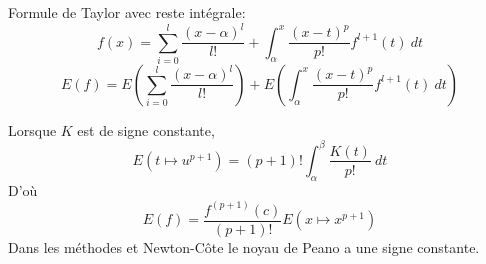 \begin{preuve}
    Formule de Taylor avec reste intégrale:
   \[
       f(x) = \sum_{i=0}^{l} \frac{(x - \alpha)^l}{l!} + \int_{{\alpha}}^{{x}} {\frac{(x-t)^{p}}{p!}f^{l+1}(t)} \: d{t} {}
   \]  
   \[
   E(f) = E\left( \sum_{i=0}^{l} \frac{(x - \alpha)^l}{l!} \right) + E\left( \int_{{\alpha}}^{{x}} {\frac{(x-t)^{p}}{p!}f^{l+1}(t)} \: d{t} {} \right) 
   \] 
\end{preuve}
\begin{remark}
    Lorsque $K$ est de signe constante,
    \[
        E(t \mapsto u^{p+1}) = (p+1)!\int_{{\alpha}}^{{\beta}} {\frac{K(t)}{p!}} \: d{t} {}
    \] 
    D'où
    \[
        E(f) = \frac{f^{(p+1)}(c)}{(p+1)!}E(x\mapsto x^{p+1})
    \] 
    Dans les méthodes et Newton-Côte le noyau de Peano a une signe constante.
\end{remark}


